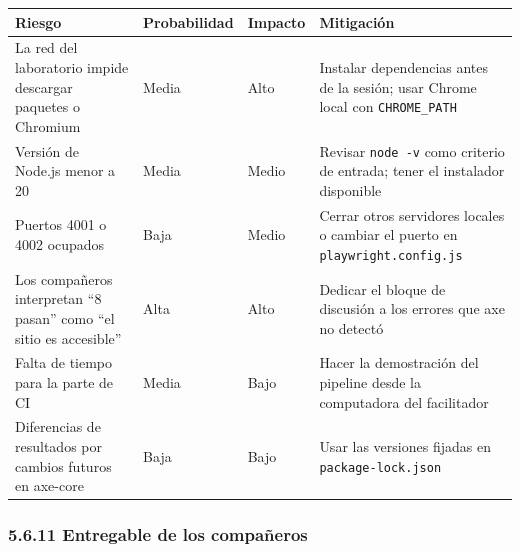 \documentclass[10pt,letterpaper,onecolumn]{IEEEtran}
\newcommand{\filafina}{\arrayrulecolor{black!30}\specialrule{0.3pt}{1.5pt}{1.5pt}\arrayrulecolor{black}}
\begin{document}
\begin{longtable}[]{@{}
  >{\raggedright\arraybackslash}p{0.2877\dimexpr\linewidth-6\tabcolsep\relax}
  >{\raggedright\arraybackslash}p{0.1781\dimexpr\linewidth-6\tabcolsep\relax}
  >{\raggedright\arraybackslash}p{0.1233\dimexpr\linewidth-6\tabcolsep\relax}
  >{\raggedright\arraybackslash}p{0.4110\dimexpr\linewidth-6\tabcolsep\relax}@{}}
\toprule\noalign{}
\begin{minipage}[b]{\linewidth}\raggedright
Riesgo
\end{minipage} & \begin{minipage}[b]{\linewidth}\raggedright
Probabilidad
\end{minipage} & \begin{minipage}[b]{\linewidth}\raggedright
Impacto
\end{minipage} & \begin{minipage}[b]{\linewidth}\raggedright
Mitigación
\end{minipage} \\
\midrule\noalign{}
\endhead
\bottomrule\noalign{}
\endlastfoot
La red del laboratorio impide descargar paquetes o Chromium & Media & Alto & Instalar dependencias antes de la sesión; usar Chrome local con \texttt{CHROME\_\allowbreak{}PATH} \\ \filafina
Versión de Node.js menor a 20 & Media & Medio & Revisar \texttt{node -\allowbreak{}\allowbreak{}v} como criterio de entrada; tener el instalador disponible \\ \filafina
Puertos 4001 o 4002 ocupados & Baja & Medio & Cerrar otros servidores locales o cambiar el puerto en \texttt{playwright.\allowbreak{}\allowbreak{}config.\allowbreak{}\allowbreak{}js} \\ \filafina
Los compañeros interpretan ``8 pasan'' como ``el sitio es accesible'' & Alta & Alto & Dedicar el bloque de discusión a los errores que axe no detectó \\ \filafina
Falta de tiempo para la parte de CI & Media & Bajo & Hacer la demostración del pipeline desde la computadora del facilitador \\ \filafina
Diferencias de resultados por cambios futuros en axe-core & Baja & Bajo & Usar las versiones fijadas en \texttt{package-\allowbreak{}\allowbreak{}lock.\allowbreak{}\allowbreak{}json} \\
\end{longtable}

\subsubsection{5.6.11 Entregable de los compañeros}\label{entregable-de-los-compauxf1eros}
\end{document}

